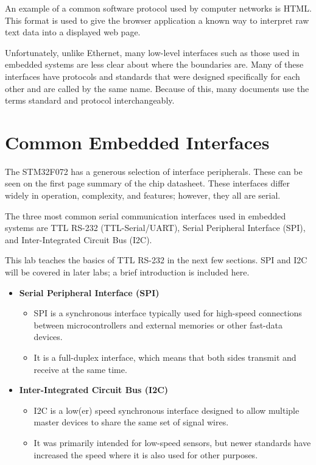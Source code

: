 \documentclass[openany,11pt,fleqn]{book} %
\begin{document}
An example of a common software protocol used by computer networks is HTML. This format is used to give the browser application a known way to interpret raw text data into a displayed web page. 

Unfortunately, unlike Ethernet, many low-level interfaces such as those used in embedded systems are less clear about where the boundaries are. Many of these interfaces have protocols and standards that were designed specifically for each other and are called by the same name. 
Because of this, many documents use the terms standard and protocol interchangeably. 
 

\section{Common Embedded Interfaces}
The STM32F072 has a generous selection of interface peripherals. These can be seen on the first page summary of the chip datasheet. These interfaces differ widely in operation, complexity, and features; however, they all are serial. 

The three most common serial communication interfaces used in embedded systems are TTL RS-232 (TTL-Serial/UART), Serial Peripheral Interface (SPI), and Inter-Integrated Circuit Bus (I2C). 

This lab teaches the basics of TTL RS-232 in the next few sections. SPI and I2C will be covered in later labs; a brief introduction is included here. 

\begin{itemize}
    \item \textbf{Serial Peripheral Interface (SPI)}
    \begin{itemize}
        \item SPI is a synchronous interface typically used for high-speed connections between microcontrollers and external memories or other fast-data devices.
        \item It is a full-duplex interface, which means that both sides transmit and receive at the same time.
    \end{itemize}
    \item \textbf{Inter-Integrated Circuit Bus (I2C)}
    \begin{itemize}
        \item I2C is a low(er) speed synchronous interface designed to allow multiple master devices to share the same set of signal wires. 
        \item It was primarily intended for low-speed sensors, but newer standards have increased the speed where it is also used for other purposes.
    \end{itemize}
\end{itemize}
\end{document}

